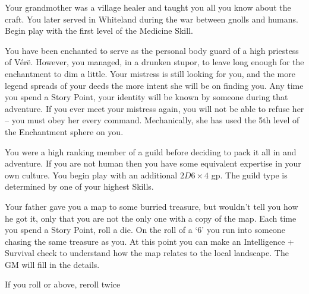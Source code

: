 \begin{list}{\addtocounter{list}{1}\textbf{:}}{\raggedleft}
\item{Your grandmother was a village healer and taught you all you know about the craft. You later served in Whiteland during the war between gnolls and humans.  Begin play with the first level of the Medicine Skill.}

\item{You have been enchanted to serve as the personal body guard of a high priestess of V\'{e}r\"{e}.  However, you managed, in a drunken stupor, to leave long enough for the enchantment to dim a little.  Your mistress is still looking for you, and the more legend spreads of your deeds the more intent she will be on finding you.  Any time you spend a Story Point, your identity will be known by someone during that adventure.  If you ever meet your mistress again, you will not be able to refuse her -- you must obey her every command.  Mechanically, she has used the 5th level of the Enchantment sphere on you.}

\item{You were a high ranking member of a guild before deciding to pack it all in and adventure.  If you are not human then you have some equivalent expertise in your own culture.  You begin play with an additional $2D6\times4$ gp.  The guild type is determined by one of your highest Skills.}

\item{Your father gave you a map to some burried treasure, but wouldn't tell you how he got it, only that you are not the only one with a copy of the map.  Each time you spend a Story Point, roll a die.  On the roll of a `6' you run into someone chasing the same treasure as you.  At this point you can make an Intelligence + Survival check to understand how the map relates to the local landscape.  The GM will fill in the details.}

\item{If you roll  or above, reroll twice}

\end{list}
